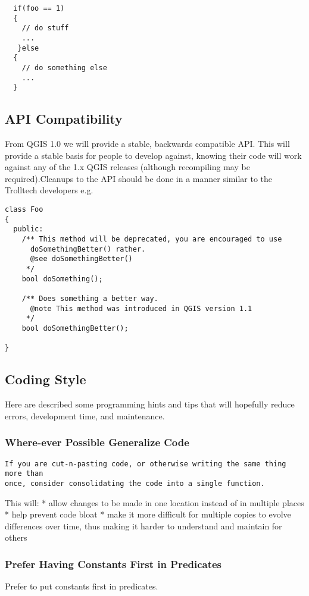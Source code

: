 \begin{verbatim}
  if(foo == 1)
  {
    // do stuff
    ...
   }else
  {
    // do something else
    ...
  }
\end{verbatim}

\subsection{API Compatibility}
From QGIS 1.0 we will provide a stable, backwards compatible API. This will
provide a stable basis for people to develop against, knowing their code will
work against any of the 1.x QGIS releases (although recompiling may be
required).Cleanups to the API should be done in a manner similar to the
Trolltech developers e.g.

\begin{verbatim}
class Foo 
{
  public:
    /** This method will be deprecated, you are encouraged to use 
      doSomethingBetter() rather.
      @see doSomethingBetter()
     */
    bool doSomething();

    /** Does something a better way.
      @note This method was introduced in QGIS version 1.1
     */
    bool doSomethingBetter();

}
\end{verbatim}

\subsection{Coding Style}
Here are described some programming hints and tips that will hopefully reduce
errors, development time, and maintenance.

\subsubsection{Where-ever Possible Generalize Code}
\begin{verbatim}
If you are cut-n-pasting code, or otherwise writing the same thing more than
once, consider consolidating the code into a single function.
\end{verbatim}

This will:
  * allow changes to be made in one location instead of in multiple places
  * help prevent code bloat
  * make it more difficult for multiple copies to evolve differences over time,
    thus making it harder to understand and maintain for others

\subsubsection{Prefer Having Constants First in Predicates}
Prefer to put constants first in predicates. 

